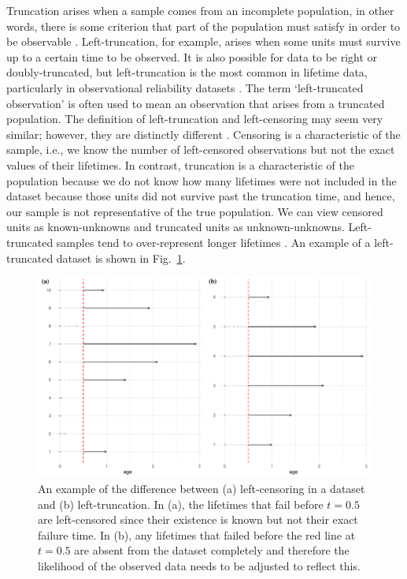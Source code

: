 Truncation arises when a sample comes from an incomplete population, in other words, there is some criterion that part of the population must satisfy in order to be observable \citep{guo1993}. Left-truncation, for example, arises when some units must survive up to a certain time to be observed. It is also possible for data to be right or doubly-truncated, but left-truncation is the most common in lifetime data, particularly in observational reliability datasets \citep{Emura2022}. The term `left-truncated observation' is often used to mean an observation that arises from a truncated population. The definition of left-truncation and left-censoring may seem very similar; however, they are distinctly different \citep{mitra2013}. Censoring is a characteristic of the sample, i.e., we know the number of left-censored observations but not the exact values of their lifetimes. In contrast, truncation is a characteristic of the population because we do not know how many lifetimes were not included in the dataset because those units did not survive past the truncation time, and hence, our sample is not representative of the true population. We can view censored units as known-unknowns and truncated units as unknown-unknowns. Left-truncated samples tend to over-represent longer lifetimes \citep{guo1993}. An example of a left-truncated dataset is shown in Fig.~\ref{fig:left_trunc_example}.

\begin{figure}
    \centering
    \includegraphics[width=1\textwidth]{./figures/ch-2/left_truncation_example.pdf}
    \caption{An example of the difference between (a) left-censoring in a dataset and (b) left-truncation. In (a), the lifetimes that fail before $t = 0.5$ are left-censored since their existence is known but not their exact failure time. In (b), any lifetimes that failed before the red line at $t = 0.5$ are absent from the dataset completely and therefore the likelihood of the observed data needs to be adjusted to reflect this.}
    \label{fig:left_trunc_example}
\end{figure}

